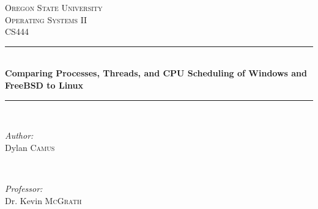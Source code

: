 \documentclass[journal,letterpaper,draftclsnofoot,onecolumn,10pt]{IEEEtran}
\begin{document}
\begin{titlepage}

\newcommand{\HRule}{\rule{\linewidth}{0.5mm}} %

\center %
 

\textsc{\LARGE Oregon State University}\\[1.5cm] %
\textsc{\Large Operating Systems II}\\[0.5cm] %
\textsc{\large CS444}\\[0.5cm] %


\HRule \\[0.4cm]
{ \huge \bfseries Comparing Processes, Threads, and CPU Scheduling of Windows and FreeBSD to Linux}\\[0.4cm] %
\HRule \\[1.5cm]
 

\begin{minipage}{0.4\textwidth}
   \begin{flushleft} \large
      \emph{Author:}\\
      Dylan \textsc{Camus} %
   \end{flushleft}
\end{minipage}
~
\begin{minipage}{0.4\textwidth}
   \begin{flushright} \large
      \emph{Professor:} \\
      Dr. Kevin \textsc{McGrath} %
   \end{flushright}
\end{minipage}\\[4cm]



\end{titlepage}
\end{document}
